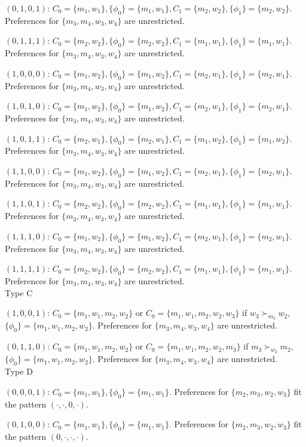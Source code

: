 \documentclass[WP]{AEA}
\begin{document}
$(0,1,0,1)$: $C_0 =\{m_1,w_1\}, \{\phi_0\}=\{m_1,w_1\}, C_1 =\{m_2,w_2\}, \{\phi_1\}=\{m_2,w_2\}$.  Preferences for $\{m_3,m_4,w_3,w_4\}$ are unrestricted.


$(0,1,1,1)$: $C_0 =\{m_2,w_2\}, \{\phi_0\}=\{m_2,w_2\}, C_1 =\{m_1,w_1\}, \{\phi_1\}=\{m_1,w_1\}$.  Preferences for $\{m_3,m_4,w_3,w_4\}$ are unrestricted.


$(1,0,0,0)$: $C_0 =\{m_1,w_2\}, \{\phi_0\}=\{m_1,w_2\}, C_1 =\{m_2,w_1\}, \{\phi_1\}=\{m_2,w_1\}$.  Preferences for $\{m_3,m_4,w_3,w_4\}$ are unrestricted.


$(1,0,1,0)$: $C_0 =\{m_1,w_2\}, \{\phi_0\}=\{m_1,w_2\}, C_1 =\{m_2,w_1\}, \{\phi_1\}=\{m_2,w_1\}$.  Preferences for $\{m_3,m_4,w_3,w_4\}$ are unrestricted.


$(1,0,1,1)$: $C_0 =\{m_2,w_1\}, \{\phi_0\}=\{m_2,w_1\}, C_1 =\{m_1,w_2\}, \{\phi_1\}=\{m_1,w_2\}$.  Preferences for $\{m_3,m_4,w_3,w_4\}$ are unrestricted.



$(1,1,0,0)$:  $C_0 =\{m_1,w_2\}, \{\phi_0\}=\{m_1,w_2\}, C_1 =\{m_2,w_1\}, \{\phi_1\}=\{m_2,w_1\}$.  Preferences for $\{m_3,m_4,w_3,w_4\}$ are unrestricted.


$(1,1,0,1)$:  $C_0 =\{m_2,w_2\}, \{\phi_0\}=\{m_2,w_2\}, C_1 =\{m_1,w_1\}, \{\phi_1\}=\{m_1,w_1\}$.  Preferences for $\{m_3,m_4,w_3,w_4\}$ are unrestricted.



$(1,1,1,0)$:  $C_0 =\{m_1,w_2\}, \{\phi_0\}=\{m_1,w_2\}, C_1 =\{m_2,w_1\}, \{\phi_1\}=\{m_2,w_1\}$.  Preferences for $\{m_3,m_4,w_3,w_4\}$ are unrestricted.



$(1,1,1,1)$:  $C_0 =\{m_2,w_2\}, \{\phi_0\}=\{m_2,w_2\}, C_1 =\{m_1,w_1\}, \{\phi_1\}=\{m_1,w_1\}$.  Preferences for $\{m_3,m_4,w_3,w_4\}$ are unrestricted.
\\

Type C

$(1,0,0,1)$:  $C_0 =\{m_1,w_1,m_2,w_2\}$ or $C_0 =\{m_1,w_1,m_2,w_2, w_3\}$ if $w_3\succ_{m_2} w_2$, $\{\phi_0\}=\{m_1,w_1,m_2,w_2\}$.  Preferences for $\{m_3,m_4,w_3,w_4\}$ are unrestricted. 

$(0,1,1,0)$:  $C_0 =\{m_1,w_1,m_2,w_2\}$ or $C_0 =\{m_1,w_1,m_2,w_2, m_3\}$ if $m_3\succ_{w_2} m_2$, $\{\phi_0\}=\{m_1,w_1,m_2,w_2\}$.  Preferences for $\{m_3,m_4,w_3,w_4\}$ are unrestricted. 
\\


Type D

$(0,0,0,1)$:  $C_0 =\{m_1,w_1\}, \{\phi_0\}=\{m_1,w_1\}$.  Preferences for $\{m_2,m_3,w_2,w_3\}$ fit the pattern $(\cdot,\cdot,0,\cdot)$.


$(0,1,0,0)$:  $C_0 =\{m_1,w_1\}, \{\phi_0\}=\{m_1,w_1\}$.  Preferences for $\{m_2,m_3,w_2,w_3\}$ fit the pattern $(0,\cdot,\cdot,\cdot)$.
\end{document}
